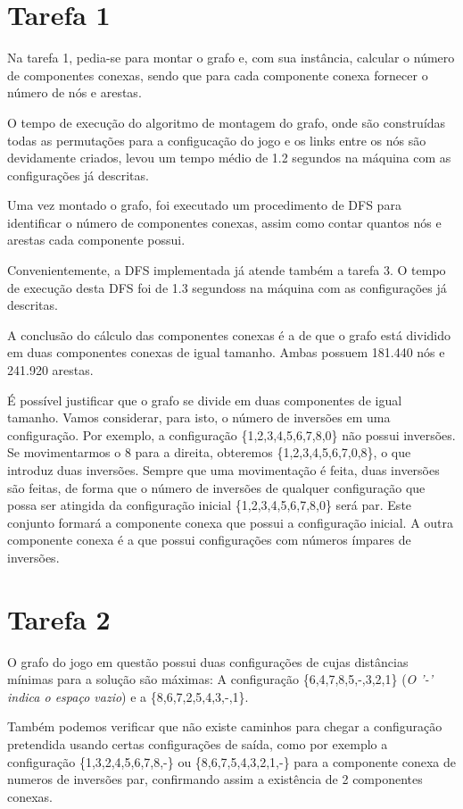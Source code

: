 \documentclass[10pt,a4paper]{report}
\begin{document}
\section*{Tarefa 1}

Na tarefa 1, pedia-se para montar o grafo e, com sua instância, calcular o número de componentes conexas, sendo que para cada componente conexa fornecer o número de nós e arestas.

O tempo de execução do algoritmo de montagem do grafo, onde são construídas todas as permutações para a configucação do jogo e os links entre os nós são devidamente criados, levou um tempo médio de 1.2 segundos na máquina com as configurações já descritas.

Uma vez montado o grafo, foi executado um procedimento de DFS para identificar o número de componentes conexas, assim como contar quantos nós e arestas cada componente possui.

Convenientemente, a DFS implementada já atende também a tarefa 3. O tempo de execução desta DFS foi de 1.3 segundoss na máquina com as configurações já descritas.

A conclusão do cálculo das componentes conexas é a de que o grafo está dividido em duas componentes conexas de igual tamanho. Ambas possuem 181.440 nós e 241.920 arestas.

É possível justificar que o grafo se divide em duas componentes de igual tamanho. Vamos considerar, para isto, o número de inversões em uma configuração. Por exemplo, a configuração \{1,2,3,4,5,6,7,8,0\} não possui inversões. Se movimentarmos o 8 para a direita, obteremos \{1,2,3,4,5,6,7,0,8\}, o que introduz duas inversões. Sempre que uma movimentação é feita, duas inversões são feitas, de forma que o número de inversões de qualquer configuração que possa ser atingida da configuração inicial \{1,2,3,4,5,6,7,8,0\} será par. Este conjunto formará a componente conexa que possui a configuração inicial. A outra componente conexa é a que possui configurações com números ímpares de inversões.

\section*{Tarefa 2}

O grafo do jogo em questão possui duas configurações de cujas distâncias mínimas para a solução são máximas: A configuração
\{6,4,7,8,5,-,3,2,1\} (\textit{O '-' indica o espaço vazio}) e a
\{8,6,7,2,5,4,3,-,1\}.

Também podemos verificar que não existe caminhos para chegar a configuração pretendida usando certas configurações de saída, como por exemplo a configuração \{1,3,2,4,5,6,7,8,-\} ou \{8,6,7,5,4,3,2,1,-\} para a componente conexa de numeros de inversões par, confirmando assim a existência de 2 componentes conexas.
\end{document}
